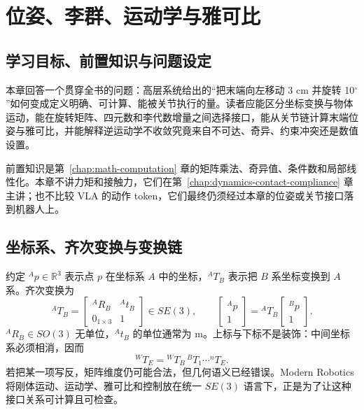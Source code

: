 \chapter{位姿、李群、运动学与雅可比}
\label{chap:kinematics-lie}

\section{学习目标、前置知识与问题设定}

本章回答一个贯穿全书的问题：高层系统给出的“把末端向左移动 3 cm 并旋转 10$^\circ$”如何变成定义明确、可计算、能被关节执行的量。读者应能区分坐标变换与物体运动，能在旋转矩阵、四元数和李代数增量之间选择接口，能从关节链计算末端位姿与雅可比，并能解释逆运动学不收敛究竟来自不可达、奇异、约束冲突还是数值设置。

前置知识是第~\ref{chap:math-computation} 章的矩阵乘法、奇异值、条件数和局部线性化。本章不讲力矩和接触力，它们在第~\ref{chap:dynamics-contact-compliance} 章主讲；也不比较 VLA 的动作 token，它们最终仍须经过本章的位姿或关节接口落到机器人上。

\section{坐标系、齐次变换与变换链}

约定 ${}^{A}p\in\mathbb{R}^3$ 表示点 $p$ 在坐标系 $A$ 中的坐标，${}^{A}T_B$ 表示把 $B$ 系坐标变换到 $A$ 系。齐次变换为
\begin{equation}
{}^{A}T_B=
\begin{bmatrix}
{}^{A}R_B & {}^{A}t_B\\
0_{1\times3} & 1
\end{bmatrix}\in SE(3),\qquad
\begin{bmatrix}{}^{A}p\\1\end{bmatrix}
={}^{A}T_B\begin{bmatrix}{}^{B}p\\1\end{bmatrix}.
\label{eq:homogeneous-transform}
\end{equation}
${}^{A}R_B\in SO(3)$ 无单位，${}^{A}t_B$ 的单位通常为 m。上标与下标不是装饰：中间坐标系必须相消，因而
\begin{equation}
{}^{W}T_E={}^{W}T_B\,{}^{B}T_1\cdots{}^{n}T_E.
\label{eq:transform-chain}
\end{equation}
若把某一项写反，矩阵维度仍可能合法，但几何语义已经错误。Modern Robotics 将刚体运动、运动学、雅可比和控制放在统一 $SE(3)$ 语言下，正是为了让这种接口关系可计算且可检查\cite{lynch2017modern,modern_robotics}。

